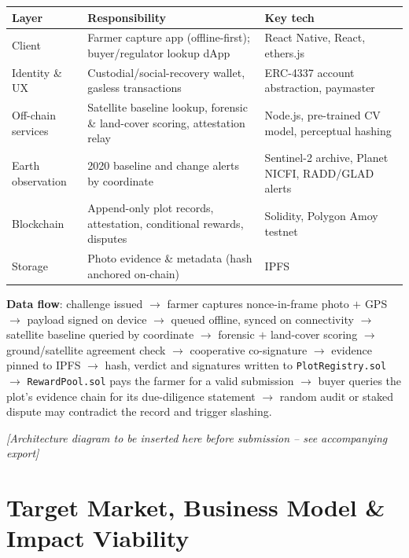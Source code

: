 \documentclass[11pt]{article}
\begin{document}
\begin{center}
\begin{tabularx}{\linewidth}{@{}l X l@{}}
\toprule
\textbf{Layer} & \textbf{Responsibility} & \textbf{Key tech} \\
\midrule
Client & Farmer capture app (offline-first); buyer/regulator lookup dApp & React Native, React, ethers.js \\
Identity \& UX & Custodial/social-recovery wallet, gasless transactions & ERC-4337 account abstraction, paymaster \\
Off-chain services & Satellite baseline lookup, forensic \& land-cover scoring, attestation relay & Node.js, pre-trained CV model, perceptual hashing \\
Earth observation & 2020 baseline and change alerts by coordinate & Sentinel-2 archive, Planet NICFI, RADD/GLAD alerts \\
Blockchain & Append-only plot records, attestation, conditional rewards, disputes & Solidity, Polygon Amoy testnet \\
Storage & Photo evidence \& metadata (hash anchored on-chain) & IPFS \\
\bottomrule
\end{tabularx}
\end{center}

\vspace{0.6em}
\noindent\textbf{Data flow}: challenge issued $\rightarrow$ farmer captures nonce-in-frame photo $+$ GPS $\rightarrow$ payload signed on device $\rightarrow$ queued offline, synced on connectivity $\rightarrow$ satellite baseline queried by coordinate $\rightarrow$ forensic $+$ land-cover scoring $\rightarrow$ ground/satellite agreement check $\rightarrow$ cooperative co-signature $\rightarrow$ evidence pinned to IPFS $\rightarrow$ hash, verdict and signatures written to \texttt{PlotRegistry.sol} $\rightarrow$ \texttt{RewardPool.sol} pays the farmer for a valid submission $\rightarrow$ buyer queries the plot's evidence chain for its due-diligence statement $\rightarrow$ random audit or staked dispute may contradict the record and trigger slashing.

\vspace{0.6em}
\noindent\textit{[Architecture diagram to be inserted here before submission -- see accompanying export]}

\section{Target Market, Business Model \& Impact Viability}
\end{document}
